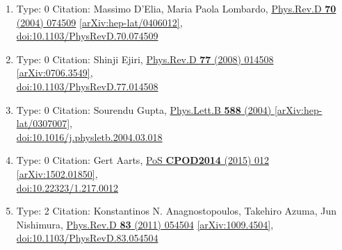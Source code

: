 \documentclass[a4paper,10pt]{article}
\begin{document}
\begin{enumerate}
\begin{enumerate}
  \item Type: 0 Citation: Massimo D'Elia, Maria Paola Lombardo, \href{https://www.doi.org/10.1103/PhysRevD.70.074509}{Phys.Rev.D {\bf 70} (2004) 074509}  \href{https://arxiv.org/abs/hep-lat/0406012}{[arXiv:hep-lat/0406012]},\\\href{https://www.doi.org/10.1103/PhysRevD.70.074509}{doi:10.1103/PhysRevD.70.074509}
  \item Type: 0 Citation: Shinji Ejiri, \href{https://www.doi.org/10.1103/PhysRevD.77.014508}{Phys.Rev.D {\bf 77} (2008) 014508}  \href{https://arxiv.org/abs/0706.3549}{[arXiv:0706.3549]},\\\href{https://www.doi.org/10.1103/PhysRevD.77.014508}{doi:10.1103/PhysRevD.77.014508}
  \item Type: 0 Citation: Sourendu Gupta, \href{https://www.doi.org/10.1016/j.physletb.2004.03.018}{Phys.Lett.B {\bf 588} (2004) }  \href{https://arxiv.org/abs/hep-lat/0307007}{[arXiv:hep-lat/0307007]},\\\href{https://www.doi.org/10.1016/j.physletb.2004.03.018}{doi:10.1016/j.physletb.2004.03.018}
  \item Type: 0 Citation: Gert Aarts, \href{https://www.doi.org/10.22323/1.217.0012}{PoS {\bf CPOD2014} (2015) 012}  \href{https://arxiv.org/abs/1502.01850}{[arXiv:1502.01850]},\\\href{https://www.doi.org/10.22323/1.217.0012}{doi:10.22323/1.217.0012}
  \item Type: 2 Citation: Konstantinos N. Anagnostopoulos, Takehiro Azuma, Jun Nishimura, \href{https://www.doi.org/10.1103/PhysRevD.83.054504}{Phys.Rev.D {\bf 83} (2011) 054504}  \href{https://arxiv.org/abs/1009.4504}{[arXiv:1009.4504]},\\\href{https://www.doi.org/10.1103/PhysRevD.83.054504}{doi:10.1103/PhysRevD.83.054504}

\end{enumerate}
\end{enumerate}
\end{document}
